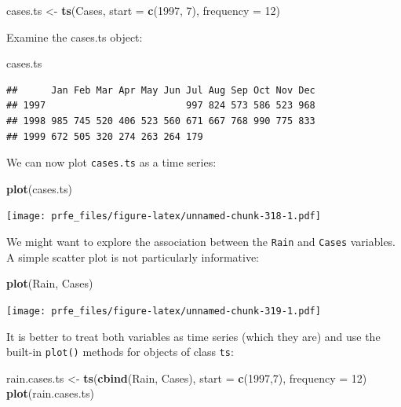\documentclass[12pt,]{book}
\newenvironment{Shaded}{\begin{snugshade}}{\end{snugshade}}
\newcommand{\KeywordTok}[1]{\textcolor[rgb]{0.13,0.29,0.53}{\textbf{#1}}}
\newcommand{\DataTypeTok}[1]{\textcolor[rgb]{0.13,0.29,0.53}{#1}}
\newcommand{\DecValTok}[1]{\textcolor[rgb]{0.00,0.00,0.81}{#1}}
\newcommand{\StringTok}[1]{\textcolor[rgb]{0.31,0.60,0.02}{#1}}
\newcommand{\NormalTok}[1]{#1}
\theoremstyle{definition}
\theoremstyle{definition}
\theoremstyle{definition}
\theoremstyle{remark}
\begin{document}
\begin{Shaded}
\begin{Highlighting}[]
\NormalTok{cases.ts <-}\StringTok{ }\KeywordTok{ts}\NormalTok{(Cases, }\DataTypeTok{start =} \KeywordTok{c}\NormalTok{(}\DecValTok{1997}\NormalTok{, }\DecValTok{7}\NormalTok{), }\DataTypeTok{frequency =} \DecValTok{12}\NormalTok{)}
\end{Highlighting}
\end{Shaded}

Examine the cases.ts object:

\begin{Shaded}
\begin{Highlighting}[]
\NormalTok{cases.ts}
\end{Highlighting}
\end{Shaded}

\begin{verbatim}
##      Jan Feb Mar Apr May Jun Jul Aug Sep Oct Nov Dec
## 1997                         997 824 573 586 523 968
## 1998 985 745 520 406 523 560 671 667 768 990 775 833
## 1999 672 505 320 274 263 264 179
\end{verbatim}

We can now plot \texttt{cases.ts} as a time series:

\begin{Shaded}
\begin{Highlighting}[]
\KeywordTok{plot}\NormalTok{(cases.ts)}
\end{Highlighting}
\end{Shaded}

\texttt{[image: prfe\_files/figure-latex/unnamed-chunk-318-1.pdf]}

We might want to explore the association between the \texttt{Rain} and
\texttt{Cases} variables. A simple scatter plot is not particularly
informative:

\begin{Shaded}
\begin{Highlighting}[]
\KeywordTok{plot}\NormalTok{(Rain, Cases)}
\end{Highlighting}
\end{Shaded}

\texttt{[image: prfe\_files/figure-latex/unnamed-chunk-319-1.pdf]}

It is better to treat both variables as time series (which they are) and
use the built-in \texttt{plot()} methods for objects of class
\texttt{ts}:

\begin{Shaded}
\begin{Highlighting}[]
\NormalTok{rain.cases.ts <-}\StringTok{ }\KeywordTok{ts}\NormalTok{(}\KeywordTok{cbind}\NormalTok{(Rain, Cases), }\DataTypeTok{start =} \KeywordTok{c}\NormalTok{(}\DecValTok{1997}\NormalTok{,}\DecValTok{7}\NormalTok{), }\DataTypeTok{frequency =} \DecValTok{12}\NormalTok{)}
\KeywordTok{plot}\NormalTok{(rain.cases.ts)}
\end{Highlighting}
\end{Shaded}
\end{document}

